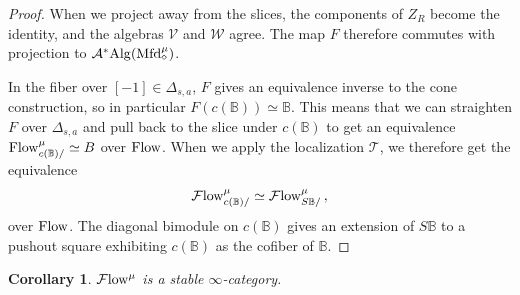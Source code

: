 \documentclass[10pt]{amsart}
\numberwithin{equation}{section}
\newtheorem{cor}[prop]{Corollary}
\theoremstyle{definition}
\newcommand{\Flow}{\cF\mathrm{low}\vphantom{w}}
\newcommand{\PreFlow}{\mathrm{Flow}\vphantom{w}}
\newcommand{\Mfd}{\mathrm{Mfd}\vphantom{d}}
\newcommand{\Alg}{\mathrm{Alg}\vphantom{z}}
\newcommand{\bB}{\mathbb{B}}
\newcommand{\Simp}{\mathbb{\Delta}}
\newcommand{\cA}{\mathcal{A}}
\newcommand{\cV}{\mathcal{V}}
\newcommand{\cW}{\mathcal{W}}
\newcommand{\cF}{\mathcal{F}}
\newcommand{\cT}{\mathcal{T}}
\begin{document}
\begin{proof}
	When we project away from the slices, the components of $Z_{R}$ become the identity, and the algebras $\cV$ and $\cW$ agree.
  The map $F$ therefore commutes with projection to $\cA^{*}\Alg(\Mfd_{\diamond}^{\mu})$.

	In the fiber over $[-1] \in \Simp_{s,a}$, $F$ gives an equivalence inverse to the cone construction, so in particular $F(c(\bB)) \simeq \bB$.
  This means that we can straighten $F$ over $\Simp_{s,a}$ and pull back to the slice under $c(\bB)$ to get an equivalence $\PreFlow^{\mu}_{c(\bB)/} \simeq B$ over $\PreFlow$.
  When we apply the localization $\cT$, we therefore get the equivalence
	\begin{align*}
		\Flow^{\mu}_{c(\bB)/} \simeq \Flow^{\mu}_{S\bB/} \,,
	\end{align*}
	over $\PreFlow$.
  The diagonal bimodule on $c(\bB)$ gives an extension of $S\bB$ to a pushout square exhibiting $c(\bB)$ as the cofiber of $\bB$.
\end{proof}

\begin{cor}\label{cor:flow_is_stable}
	$\Flow^{\mu}$ is a stable $\infty$-category.
\end{cor}
\end{document}
